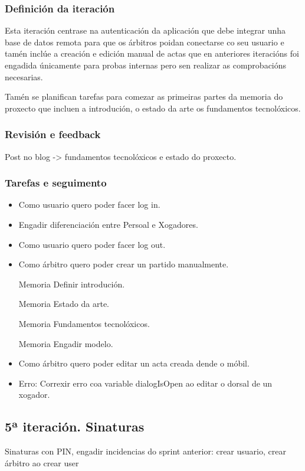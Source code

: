       \subsubsection{Definición da iteración}
      Esta iteración centrase na autenticación da aplicación que debe integrar 
unha base de datos remota para que os árbitros poidan conectarse co seu usuario 
e tamén inclúe a creación e edición manual de actas que en anteriores 
iteracións foi engadida únicamente para probas internas pero sen 
realizar as comprobacións necesarias.

      Tamén se planifican tarefas para comezar as primeiras partes da memoria 
do proxecto que incluen a introdución, o estado da arte os fundamentos 
tecnolóxicos.

      \subsubsection{Revisión e feedback}
      Post no blog -> fundamentos tecnolóxicos e estado do proxecto.

      \subsubsection{Tarefas e seguimento}

        \begin{itemize}
          \item Como usuario quero poder facer log in.
          \item Engadir diferenciación entre Persoal e Xogadores.
          \item Como usuario quero poder facer log out.
          \item Como árbitro quero poder crear un partido manualmente.
          \item [Memoria] Definir introdución.
          \item [Memoria] Estado da arte.
          \item [Memoria] Fundamentos tecnolóxicos.
          \item [Memoria] Engadir modelo.
          \item Como árbitro quero poder editar un acta creada dende o móbil.
          \item Erro: Correxir erro coa variable dialogIsOpen ao editar o 
dorsal de un xogador.
        \end{itemize}

    \subsection{5ª iteración. Sinaturas}
    Sinaturas con PIN, engadir incidencias
    do sprint anterior: crear usuario, crear árbitro ao crear user

